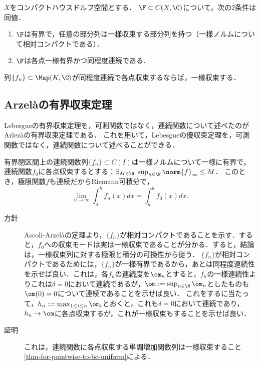 \documentclass[uplatex, dvipdfmx]{jsreport}
\begin{document}
\begin{theorem}
    $X$をコンパクトハウスドルフ空間とする．
    $\F\subset C(X,\C)$について，次の2条件は同値．
    \begin{enumerate}
        \item $\F$は有界で，任意の部分列は一様収束する部分列を持つ（一様ノルムについて相対コンパクトである）．
        \item $\F$は各点一様有界かつ同程度連続である．
    \end{enumerate}
\end{theorem}

\begin{corollary}
    列$\{f_n\}\subset\Map(K,\C)$が同程度連続で各点収束するならば，一様収束する．
\end{corollary}

\subsection{Arzelàの有界収束定理}

\begin{tcolorbox}[colframe=ForestGreen, colback=ForestGreen!10!white,breakable,colbacktitle=ForestGreen!40!white,coltitle=black,fonttitle=\bfseries\sffamily,
    title=]
        Lebesgueの有界収束定理を，可測関数ではなく，連続関数について述べたのがArlezàの有界収束定理である．
        これを用いて，Lebesgueの優収束定理を，可測関数ではなく，連続関数について述べることができる．
\end{tcolorbox}

\begin{theorem}[Arzelàの有界収束定理 (1885)]
    有界閉区間上の連続関数列$\{f_n\}\subset C(I)$は一様ノルムについて一様に有界で，連続関数$f_0$に各点収束するとする：$\exists_{M\in\R}\;\sup_{n\in\N}\norm{f}_\infty\le M$．
    このとき，極限関数$f$も連続だからRiemann可積分で，
    \[\lim_{n\to\infty}\int^b_af_n(x)dx=\int^b_af_0(x)dx.\]
\end{theorem}
\begin{Proof}\mbox{}
    \begin{description}
        \item[方針] Ascoli-Arzelàの定理より，$\{f_n\}$が相対コンパクトであることを示す．すると，$f_0$への収束モードは実は一様収束であることが分かる．すると，結論は，一様収束列に対する極限と積分の可換性から従う．
        $\{f_n\}$が相対コンパクトであるためには，$\{f_n\}$が一様有界であるから，あとは同程度連続性を示せば良い．これは，各$f_n$の連続度を$\om_n$とすると，$f_n$の一様連続性よりこれは$\delta=0$において連続であるが，$\om:=\sup_{n\in\N}\om_n$としたものも$\om(0)=0$について連続であることを示せば良い．
        これをするに当たって，$h_n:=\max_{1\le i\le n}\om_i$とおくと，これも$\delta=0$において連続であり，$h_n\to\om$に各点収束するが，これが一様収束もすることを示せば良い．
        \item[証明] これは，連続関数に各点収束する単調増加関数列は一様収束すること\ref{thm-for-pointwise-to-be-uniform}による．
    \end{description}
\end{Proof}
\end{document}
